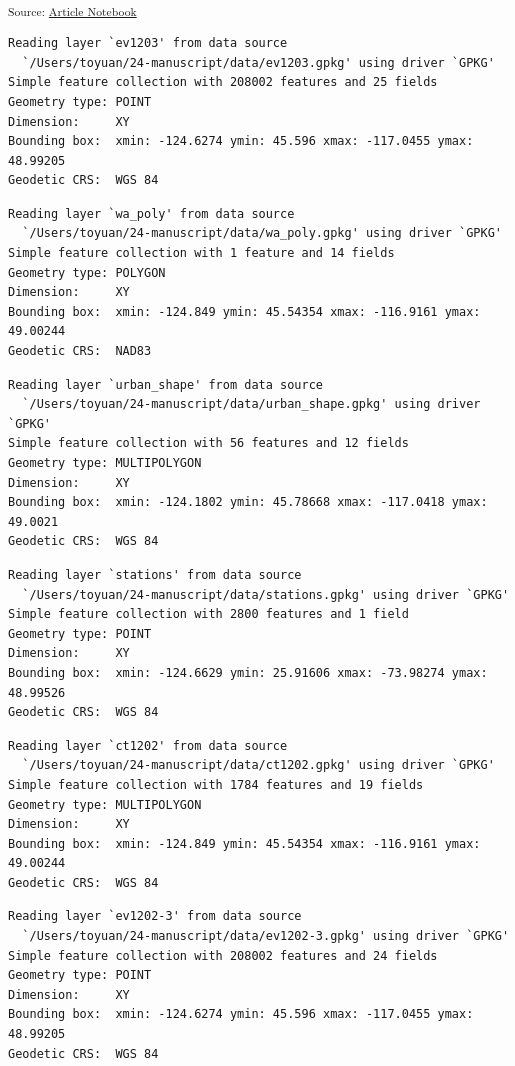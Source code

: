\documentclass[
  letterpaper,
  DIV=11,
  numbers=noendperiod]{scrartcl}
\begin{document}
\textsubscript{Source:
\href{https://h-christy.github.io/24-manuscript/index.qmd.html}{Article
Notebook}}

\begin{verbatim}
Reading layer `ev1203' from data source 
  `/Users/toyuan/24-manuscript/data/ev1203.gpkg' using driver `GPKG'
Simple feature collection with 208002 features and 25 fields
Geometry type: POINT
Dimension:     XY
Bounding box:  xmin: -124.6274 ymin: 45.596 xmax: -117.0455 ymax: 48.99205
Geodetic CRS:  WGS 84
\end{verbatim}

\begin{verbatim}
Reading layer `wa_poly' from data source 
  `/Users/toyuan/24-manuscript/data/wa_poly.gpkg' using driver `GPKG'
Simple feature collection with 1 feature and 14 fields
Geometry type: POLYGON
Dimension:     XY
Bounding box:  xmin: -124.849 ymin: 45.54354 xmax: -116.9161 ymax: 49.00244
Geodetic CRS:  NAD83
\end{verbatim}

\begin{verbatim}
Reading layer `urban_shape' from data source 
  `/Users/toyuan/24-manuscript/data/urban_shape.gpkg' using driver `GPKG'
Simple feature collection with 56 features and 12 fields
Geometry type: MULTIPOLYGON
Dimension:     XY
Bounding box:  xmin: -124.1802 ymin: 45.78668 xmax: -117.0418 ymax: 49.0021
Geodetic CRS:  WGS 84
\end{verbatim}

\begin{verbatim}
Reading layer `stations' from data source 
  `/Users/toyuan/24-manuscript/data/stations.gpkg' using driver `GPKG'
Simple feature collection with 2800 features and 1 field
Geometry type: POINT
Dimension:     XY
Bounding box:  xmin: -124.6629 ymin: 25.91606 xmax: -73.98274 ymax: 48.99526
Geodetic CRS:  WGS 84
\end{verbatim}

\begin{verbatim}
Reading layer `ct1202' from data source 
  `/Users/toyuan/24-manuscript/data/ct1202.gpkg' using driver `GPKG'
Simple feature collection with 1784 features and 19 fields
Geometry type: MULTIPOLYGON
Dimension:     XY
Bounding box:  xmin: -124.849 ymin: 45.54354 xmax: -116.9161 ymax: 49.00244
Geodetic CRS:  WGS 84
\end{verbatim}

\begin{verbatim}
Reading layer `ev1202-3' from data source 
  `/Users/toyuan/24-manuscript/data/ev1202-3.gpkg' using driver `GPKG'
Simple feature collection with 208002 features and 24 fields
Geometry type: POINT
Dimension:     XY
Bounding box:  xmin: -124.6274 ymin: 45.596 xmax: -117.0455 ymax: 48.99205
Geodetic CRS:  WGS 84
\end{verbatim}
\end{document}

